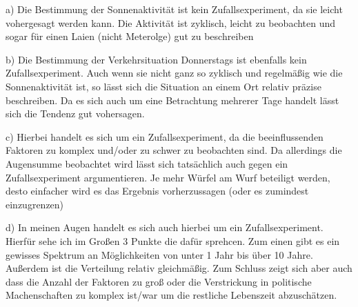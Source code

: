 a) Die Bestimmung der Sonnenaktivität ist kein Zufallsexperiment, da sie leicht vohergesagt werden kann. Die Aktivität ist zyklisch, leicht zu beobachten und sogar für einen Laien (nicht Meterolge) gut zu beschreiben

b) Die Bestimmung der Verkehrsituation Donnerstags ist ebenfalls kein Zufallsexperiment. Auch wenn sie nicht ganz so zyklisch und regelmäßig wie die Sonnenaktivität ist, so lässt sich die Situation an einem Ort relativ präzise beschreiben.
Da es sich auch um eine Betrachtung mehrerer Tage handelt lässt sich die Tendenz gut vohersagen.

c) Hierbei handelt es sich um ein Zufallsexperiment, da die beeinflussenden Faktoren zu komplex und/oder zu schwer zu beobachten sind. Da allerdings die Augensumme beobachtet wird lässt sich tatsächlich auch gegen ein Zufallsexperiment argumentieren. Je mehr Würfel am Wurf beteiligt werden, desto einfacher wird es das Ergebnis vorherzussagen (oder es zumindest einzugrenzen)

d) In meinen Augen handelt es sich auch hierbei um ein Zufallsexperiment. Hierfür sehe ich im Großen 3 Punkte die dafür sprehcen. Zum einen gibt es ein gewisses Spektrum an Möglichkeiten von unter 1 Jahr bis über 10 Jahre. Außerdem ist die Verteilung relativ gleichmäßig. Zum Schluss zeigt sich aber auch dass die Anzahl der Faktoren zu groß oder die Verstrickung in politische Machenschaften zu komplex ist/war um die restliche Lebenszeit abzuschätzen.

